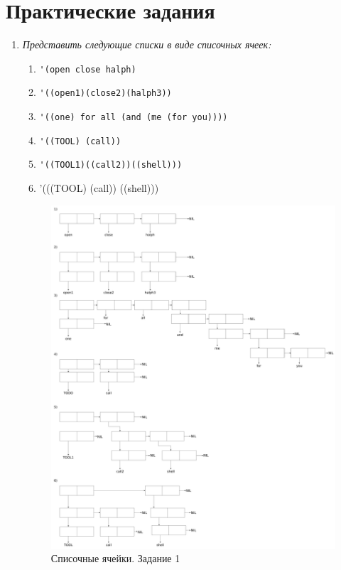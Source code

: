\chapter{Практические задания}

\begin{enumerate}[wide=0pt]
\item \textit{Представить следующие списки в виде списочных ячеек:}
\begin{enumerate}[label=\arabic*)]
	\item \lstinline {'(open close halph)}
	\item \lstinline {'((open1)(close2)(halph3))}
	\item \lstinline {'((one) for all (and (me (for you))))}
	\item \lstinline {'((TOOL) (call))}
	\item \lstinline {'((TOOL1)((call2))((shell)))}
	\item  {'(((TOOL) (call)) ((shell)))}
\end{enumerate}


\begin{figure}[ht!]
	\centering
	\includegraphics[width=1\linewidth]{assets/task1/1.pdf}
	\caption{Списочные ячейки. Задание 1}
\end{figure}
\FloatBarrier




\end{enumerate}
